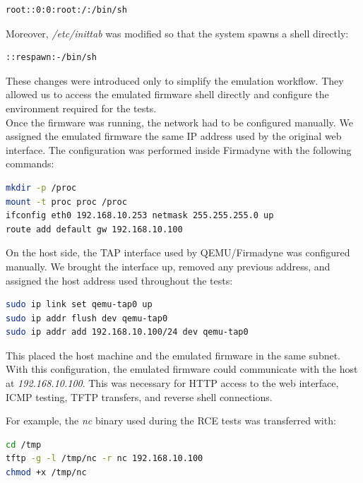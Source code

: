 \begin{lstlisting}[language=bash]
root::0:0:root:/:/bin/sh
\end{lstlisting}

              Moreover, \emph{/etc/inittab} was modified so that the system spawns a shell directly:

\begin{lstlisting}[language=bash]
::respawn:-/bin/sh
\end{lstlisting}

              These changes were introduced only to simplify the emulation workflow. They allowed us to access the emulated firmware shell directly and configure the environment required for the tests.
              \\
              Once the firmware was running, the network had to be configured manually. We assigned the emulated firmware the same IP address used by the original web interface. The configuration was performed inside
              Firmadyne with the following commands:

\begin{lstlisting}[language=bash]
mkdir -p /proc
mount -t proc proc /proc
ifconfig eth0 192.168.10.253 netmask 255.255.255.0 up
route add default gw 192.168.10.100
\end{lstlisting}

               On the host side, the TAP interface used by QEMU/Firmadyne was configured manually. We brought the interface up, removed any previous address, and assigned the host address used throughout the tests:

\begin{lstlisting}[language=bash]
sudo ip link set qemu-tap0 up
sudo ip addr flush dev qemu-tap0
sudo ip addr add 192.168.10.100/24 dev qemu-tap0
\end{lstlisting}

                This placed the host machine and the emulated firmware in the same subnet. With this configuration, the emulated firmware could communicate with the host at \emph{192.168.10.100}. This was necessary
                for HTTP access to the web interface, ICMP testing, TFTP transfers, and reverse shell connections.

                For example, the \emph{nc} binary used during the RCE tests was transferred with:

\begin{lstlisting}[language=bash]
cd /tmp
tftp -g -l /tmp/nc -r nc 192.168.10.100
chmod +x /tmp/nc
\end{lstlisting}


